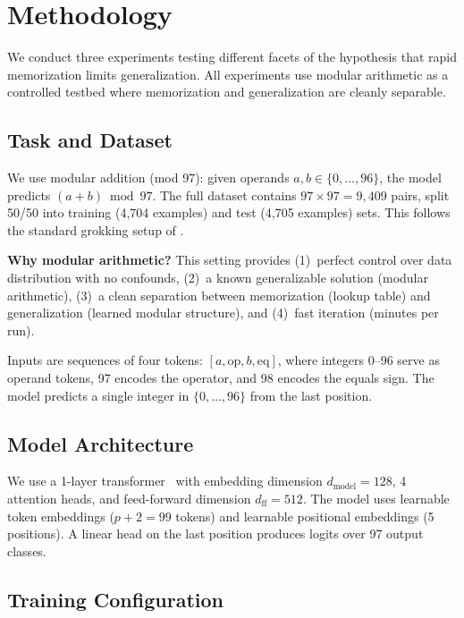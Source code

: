 \section{Methodology}
\label{sec:method}

We conduct three experiments testing different facets of the hypothesis that rapid memorization limits generalization. All experiments use modular arithmetic as a controlled testbed where memorization and generalization are cleanly separable.

\subsection{Task and Dataset}
\label{sec:task}

We use modular addition (mod 97): given operands $a, b \in \{0, \ldots, 96\}$, the model predicts $(a + b) \bmod 97$. The full dataset contains $97 \times 97 = 9{,}409$ pairs, split 50/50 into training (4,704 examples) and test (4,705 examples) sets. This follows the standard grokking setup of \citet{power2022grokking}.

{\bf Why modular arithmetic?} This setting provides (1)~perfect control over data distribution with no confounds, (2)~a known generalizable solution (modular arithmetic), (3)~a clean separation between memorization (lookup table) and generalization (learned modular structure), and (4)~fast iteration (minutes per run).

 Inputs are sequences of four tokens: $[a, \text{op}, b, \text{eq}]$, where integers 0--96 serve as operand tokens, 97 encodes the operator, and 98 encodes the equals sign. The model predicts a single integer in $\{0, \ldots, 96\}$ from the last position.

\subsection{Model Architecture}

We use a 1-layer transformer~\cite{vaswani2017attention} with embedding dimension $d_{\text{model}} = 128$, 4 attention heads, and feed-forward dimension $d_{\text{ff}} = 512$. The model uses learnable token embeddings ($p + 2 = 99$ tokens) and learnable positional embeddings (5 positions). A linear head on the last position produces logits over 97 output classes.

\subsection{Training Configuration}

